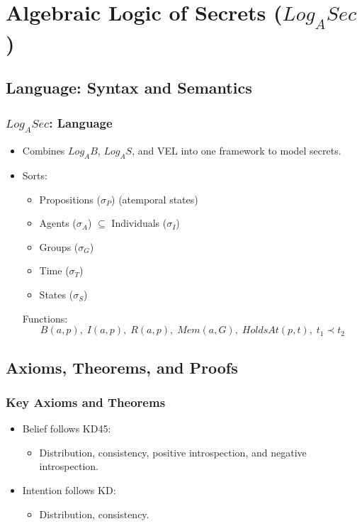\documentclass[aspectratio=169]{beamer}
\begin{document}
\section{Algebraic Logic of Secrets ($Log_ASec$)}

\subsection{Language: Syntax and Semantics}
\begin{frame}
\frametitle{$Log_ASec$: Language}
\begin{itemize}
    \item Combines $Log_AB$, $Log_AS$, and VEL into one framework to model secrets.
    \item Sorts:
    \begin{itemize}
        \item Propositions ($\sigma_P$) (atemporal states)
        \item Agents ($\sigma_A$) $\subseteq$ Individuals ($\sigma_I$)
        \item Groups ($\sigma_G$)
        \item Time ($\sigma_T$)
        \item States ($\sigma_S$)
    \end{itemize}
    \begin{block}{Functions:}
    \[
    B(a, p), \; I(a, p), \; R(a, p), \;
    Mem(a, G), \; HoldsAt(p, t), \; t_1 \prec t_2
    \]
    \end{block}
\end{itemize}
\end{frame}

\subsection{Axioms, Theorems, and Proofs}
\begin{frame}
\frametitle{Key Axioms and Theorems}
\Large 
\begin{itemize}
    \item Belief follows KD45:
    \begin{itemize}
        \Large 
        \item Distribution, consistency, positive introspection, and negative introspection.
    \end{itemize}
    \item Intention follows KD:
    \begin{itemize}
        \Large 
        \item Distribution, consistency.
    \end{itemize}
\end{itemize}
\end{frame}
\end{document}
